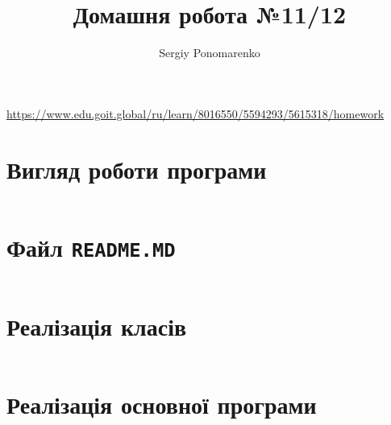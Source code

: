 \documentclass[14pt]{extarticle}
\title{Домашня робота №11/12}
\author{Sergiy Ponomarenko}
\begin{document}
\maketitle

\begin{center}\scriptsize
\url{https://www.edu.goit.global/ru/learn/8016550/5594293/5615318/homework}
\end{center}

\section{Вигляд роботи програми}


\begin{center}
\inputminted[fontsize=\scriptsize]{text}{primer.txt}
\end{center}


\section{Файл \texttt{README.MD}}

\inputminted[fontsize=\scriptsize,%
 numbersep = 1pt,%
 breaklines=true,%
 framesep=1mm,%
 baselinestretch=0.95,%
 bgcolor=gray!5,%
 fontsize=\scriptsize,%
 linenos]{text}{readme.md}

 \section{Реалізація класів}

 \inputminted[fontsize=\scriptsize,%
  numbersep = 1pt,%
  breaklines=true,%
  framesep=1mm,%
  baselinestretch=0.95,%
  bgcolor=gray!5,%
  fontsize=\footnotesize,%
  linenos]{python}{botmodule.py}

 \section{Реалізація основної програми}

\inputminted[fontsize=\scriptsize,%
 numbersep = 1pt,%
 breaklines=true,%
 framesep=1mm,%
 baselinestretch=0.95,%
 bgcolor=gray!5,%
 fontsize=\footnotesize,%
 linenos]{python}{main.py}
\end{document}
